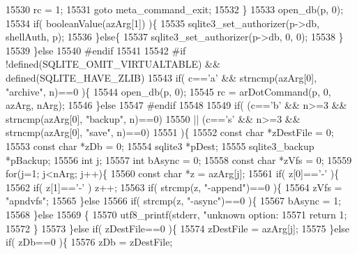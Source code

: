 \begin{DoxyCode}
15530       rc = 1;
15531       \textcolor{keywordflow}{goto} meta\_command\_exit;
15532     \}
15533     open_db(p, 0);
15534     \textcolor{keywordflow}{if}( booleanValue(azArg[1]) )\{
15535       sqlite3_set_authorizer(p->db, shellAuth, p);
15536     \}\textcolor{keywordflow}{else}\{
15537       sqlite3_set_authorizer(p->db, 0, 0);
15538     \}
15539   \}\textcolor{keywordflow}{else}
15540 \textcolor{preprocessor}{#endif}
15541 
15542 \textcolor{preprocessor}{#if !defined(SQLITE\_OMIT\_VIRTUALTABLE) && defined(SQLITE\_HAVE\_ZLIB)}
15543   \textcolor{keywordflow}{if}( c==\textcolor{charliteral}{'a'} && strncmp(azArg[0], \textcolor{stringliteral}{"archive"}, n)==0 )\{
15544     open_db(p, 0);
15545     rc = arDotCommand(p, 0, azArg, nArg);
15546   \}\textcolor{keywordflow}{else}
15547 \textcolor{preprocessor}{#endif}
15548 
15549   \textcolor{keywordflow}{if}( (c==\textcolor{charliteral}{'b'} && n>=3 && strncmp(azArg[0], \textcolor{stringliteral}{"backup"}, n)==0)
15550    || (c==\textcolor{charliteral}{'s'} && n>=3 && strncmp(azArg[0], \textcolor{stringliteral}{"save"}, n)==0)
15551   )\{
15552     \textcolor{keyword}{const} \textcolor{keywordtype}{char} *zDestFile = 0;
15553     \textcolor{keyword}{const} \textcolor{keywordtype}{char} *zDb = 0;
15554     sqlite3 *pDest;
15555     sqlite3_backup *pBackup;
15556     \textcolor{keywordtype}{int} j;
15557     \textcolor{keywordtype}{int} bAsync = 0;
15558     \textcolor{keyword}{const} \textcolor{keywordtype}{char} *zVfs = 0;
15559     \textcolor{keywordflow}{for}(j=1; j<nArg; j++)\{
15560       \textcolor{keyword}{const} \textcolor{keywordtype}{char} *z = azArg[j];
15561       \textcolor{keywordflow}{if}( z[0]==\textcolor{charliteral}{'-'} )\{
15562         \textcolor{keywordflow}{if}( z[1]==\textcolor{charliteral}{'-'} ) z++;
15563         \textcolor{keywordflow}{if}( strcmp(z, \textcolor{stringliteral}{"-append"})==0 )\{
15564           zVfs = \textcolor{stringliteral}{"apndvfs"};
15565         \}\textcolor{keywordflow}{else}
15566         \textcolor{keywordflow}{if}( strcmp(z, \textcolor{stringliteral}{"-async"})==0 )\{
15567           bAsync = 1;
15568         \}\textcolor{keywordflow}{else}
15569         \{
15570           utf8_printf(stderr, \textcolor{stringliteral}{"unknown option: %
15571           \textcolor{keywordflow}{return} 1;
15572         \}
15573       \}\textcolor{keywordflow}{else} \textcolor{keywordflow}{if}( zDestFile==0 )\{
15574         zDestFile = azArg[j];
15575       \}\textcolor{keywordflow}{else} \textcolor{keywordflow}{if}( zDb==0 )\{
15576         zDb = zDestFile;
}
\end{DoxyCode}
